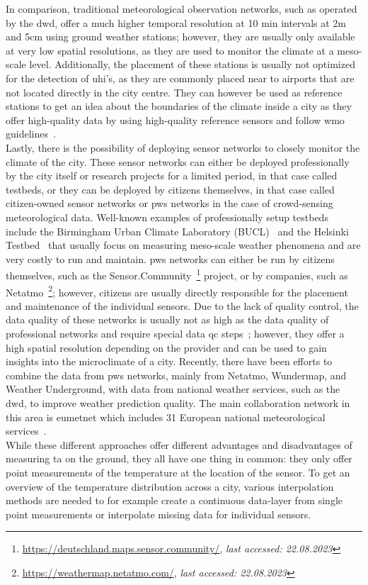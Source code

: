 In comparison, traditional meteorological observation networks, such as operated by the \gls{dwd}, offer a much higher temporal resolution at 10 min intervals at 2m and 5cm using ground weather stations; however, they are usually only available at very low spatial resolutions, as they are used to monitor the climate at a meso-scale level. Additionally, the placement of these stations is usually not optimized for the detection of \gls{uhi}'s, as they are commonly placed near to airports that are not located directly in the city centre. They can however be used as reference stations to get an idea about the boundaries of the climate inside a city as they offer high-quality data by using high-quality reference sensors and follow \gls{wmo} guidelines~\cite{oke2006guideline}.\\
Lastly, there is the possibility of deploying sensor networks to closely monitor the climate of the city. These sensor networks can either be deployed professionally by the city itself or research projects for a limited period, in that case called testbeds, or they can be deployed by citizens themselves, in that case called citizen-owned sensor networks or \gls{pws} networks in the case of crowd-sensing meteorological data. Well-known examples of professionally setup testbeds include the Birmingham Urban Climate Laboratory (BUCL)~\cite{chapman2015birmingham} and the Helsinki Testbed~\cite{koskinen2011helsinki} that usually focus on measuring meso-scale weather phenomena and are very costly to run and maintain.
\gls{pws} networks can either be run by citizens themselves, such as the Sensor.Community~\footnote{\url{https://deutschland.maps.sensor.community/}, \textit{last accessed: 22.08.2023}} project, or by companies, such as Netatmo~\footnote{\url{https://weathermap.netatmo.com/}, \textit{last accessed: 22.08.2023}}; however, citizens are usually directly responsible for the placement and maintenance of the individual sensors. Due to the lack of quality control, the data quality of these networks is usually not as high as the data quality of professional networks and require special data \gls{qc} steps~\cite{fenner2021crowdqc+, meier2017crowdsourcing}; however, they offer a high spatial resolution depending on the provider and can be used to gain insights into the microclimate of a city. Recently, there have been efforts to combine the data from \gls{pws} networks, mainly from Netatmo, Wundermap, and Weather Underground, with data from national weather services, such as the \gls{dwd}, to improve weather prediction quality. The main collaboration network in this area is \gls{eumetnet} which includes 31 European national meteorological services~\cite{hahn2022observations}.\\
While these different approaches offer different advantages and disadvantages of measuring \gls{ta} on the ground, they all have one thing in common: they only offer point measurements of the temperature at the location of the sensor. To get an overview of the temperature distribution across a city, various interpolation methods are needed to for example create a continuous data-layer from single point measurements or interpolate missing data for individual sensors.

